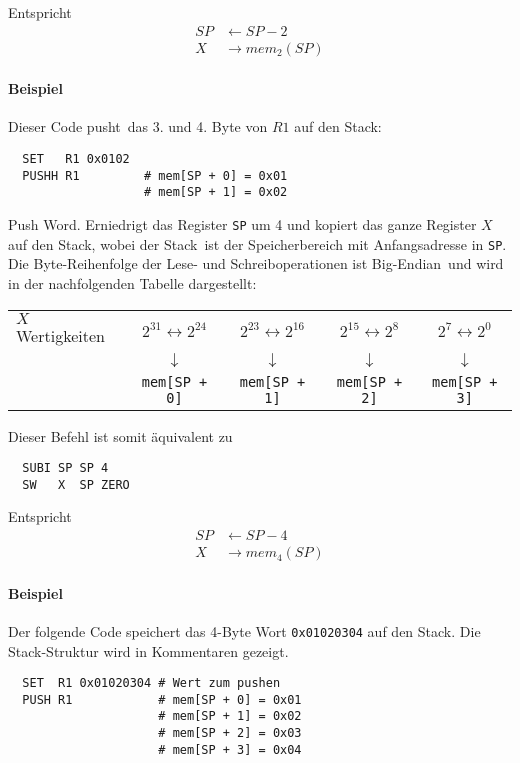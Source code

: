 Entspricht
\begin{align*}
  SP & \gets SP - 2    \\
  X  & \to mem_{2}(SP)
\end{align*}

\paragraph{Beispiel}
Dieser Code \glqq pusht\grqq\ das 3. und 4. Byte von $R1$ auf den Stack:
\begin{lstlisting}
  SET   R1 0x0102
  PUSHH R1         # mem[SP + 0] = 0x01
                   # mem[SP + 1] = 0x02
\end{lstlisting}


\glqq Push Word\grqq.
Erniedrigt das Register \texttt{SP} um 4 und kopiert das ganze Register $X$ auf
den Stack, wobei der \glqq Stack\grqq\ ist der Speicherbereich mit
Anfangsadresse in \texttt{SP}.
Die Byte-Reihenfolge der Lese- und Schreiboperationen ist \glqq Big-Endian\grqq\
und wird in der nachfolgenden Tabelle dargestellt:
\begin{center}
\begin{tabular}{l|cccc}
  \toprule
  $X$  Wertigkeiten &
  $2^{31} \leftrightarrow 2^{24}$ &
  $2^{23} \leftrightarrow 2^{16}$ &
  $2^{15} \leftrightarrow 2^{8}$  &
  $2^{7}  \leftrightarrow 2^{0}$ 
  \\
  &
  $\downarrow$ & $\downarrow$ & $\downarrow$ & $\downarrow$ 
  \\
  \text{Stack-Bereich} &
  \texttt{mem[SP + 0]} &
  \texttt{mem[SP + 1]} &
  \texttt{mem[SP + 2]} &
  \texttt{mem[SP + 3]}
  \\\bottomrule
\end{tabular}
\end{center}




Dieser Befehl ist somit äquivalent zu 
\begin{lstlisting}
  SUBI SP SP 4
  SW   X  SP ZERO
\end{lstlisting}
Entspricht
\begin{align*}
  SP & \gets SP - 4    \\
  X  & \to mem_{4}(SP)
\end{align*}

\paragraph{Beispiel}
Der folgende Code speichert das 4-Byte Wort \texttt{0x01020304} auf den Stack.
Die Stack-Struktur wird in Kommentaren gezeigt.
\begin{lstlisting}
  SET  R1 0x01020304 # Wert zum pushen
  PUSH R1            # mem[SP + 0] = 0x01
                     # mem[SP + 1] = 0x02
                     # mem[SP + 2] = 0x03
                     # mem[SP + 3] = 0x04
\end{lstlisting}




